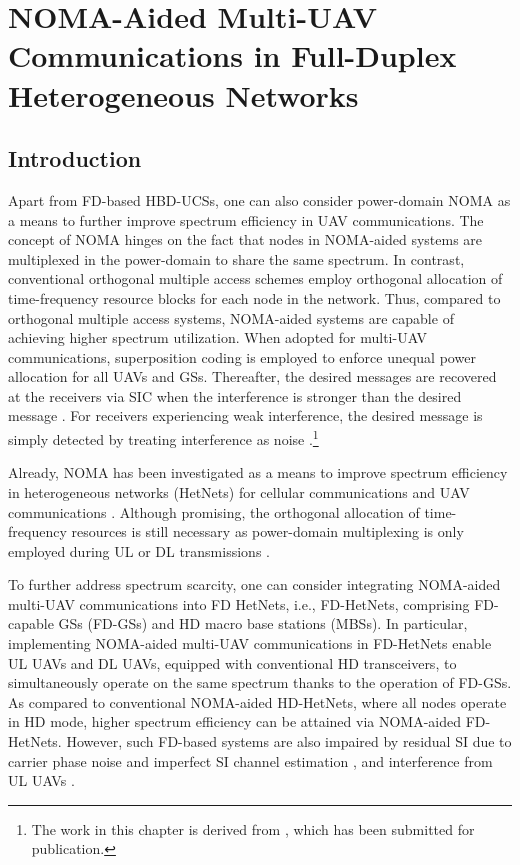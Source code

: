 \chapter{NOMA-Aided Multi-UAV Communications in Full-Duplex Heterogeneous Networks}
\label{chap:NOMA_aided_multi_UAV_FD_HetNet}

\section{Introduction}

Apart from FD-based HBD-UCSs, one can also consider power-domain NOMA as a means to further improve spectrum efficiency in UAV communications. The concept of NOMA hinges on the fact that nodes in NOMA-aided systems are multiplexed in the power-domain to share the same spectrum. In contrast, conventional orthogonal multiple access schemes employ orthogonal allocation of time-frequency resource blocks for each node in the network. Thus, compared to orthogonal multiple access systems, NOMA-aided systems are capable of achieving higher spectrum utilization. When adopted for multi-UAV communications, superposition coding is employed to enforce unequal power allocation for all UAVs and GSs. Thereafter, the desired messages are recovered at the receivers via SIC when the interference is stronger than the desired message \cite{liu2019uav,yang2016general,cui2016novel,kader2018full,salehi2019meta,weber2007transmission,islam2017power}. For receivers experiencing weak interference, the desired message is simply detected by treating interference as noise \cite{liu2019uav,islam2017power}.\footnote{The work in this chapter is derived from \cite{ernest2019hetnet}, which has been submitted for publication.}

Already, NOMA has been investigated as a means to improve spectrum efficiency in heterogeneous networks (HetNets) for cellular communications \cite{moltafet2018optimal,liu2018heterogeneous} and UAV communications \cite{liu2019dsf}. Although promising, the orthogonal allocation of time-frequency resources is still necessary as power-domain multiplexing is only employed during UL or DL transmissions \cite{ernest2019noma,ding2018coexistence}. 

To further address spectrum scarcity, one can consider integrating NOMA-aided multi-UAV communications into FD HetNets, i.e., FD-HetNets, comprising FD-capable GSs (FD-GSs) and HD macro base stations (MBSs). In particular, implementing NOMA-aided multi-UAV communications in FD-HetNets enable UL UAVs and DL UAVs, equipped with conventional HD transceivers, to simultaneously operate on the same spectrum thanks to the operation of FD-GSs. As compared to conventional NOMA-aided HD-HetNets, where all nodes operate in HD mode, higher spectrum efficiency can be attained via NOMA-aided FD-HetNets. However, such FD-based systems are also impaired by residual SI due to carrier phase noise and imperfect SI channel estimation \cite{sahai2013impact}, and interference from UL UAVs \cite{tan2018joint,ernest2019noma,ernest2019power}.

